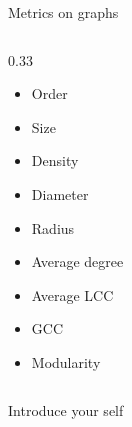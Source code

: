 \documentclass[aspectratio=169]{beamer}
\begin{document}
\begin{frame}{Metrics on graphs}
\begin{columns}[t]
\begin{column}{0.33\textwidth}
\begin{itemize}
\begin{itemize}
                        \item Order
                        \item Size
                        \item Density
                        \item Diameter
                        \item Radius
                        \item Average degree
                        \item Average LCC
                        \item GCC
                        \item Modularity
                    \end{itemize}
                \end{itemize}
            \end{column}
        \end{columns}

        \begin{note}
            {Introduce your self}
        \end{note}
    \end{frame}
\end{document}
